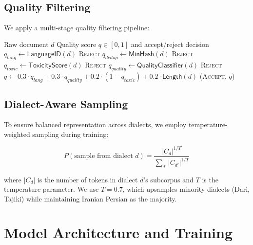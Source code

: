 \documentclass[11pt,a4paper]{article}
\begin{document}
\subsection{Quality Filtering}

We apply a multi-stage quality filtering pipeline:

\begin{algorithm}[H]
\caption{Corpus Quality Filtering}
\label{alg:filter}
\begin{algorithmic}[1]
\Require Raw document $d$
\Ensure Quality score $q \in [0, 1]$ and accept/reject decision
\State $q_{\mathit{lang}} \leftarrow \mathsf{LanguageID}(d)$ 
    \State \Return \textsc{Reject}
\EndIf
\State $q_{\mathit{dedup}} \leftarrow \mathsf{MinHash}(d)$ 
    \State \Return \textsc{Reject}
\EndIf
\State $q_{\mathit{toxic}} \leftarrow \mathsf{ToxicityScore}(d)$ 
    \State \Return \textsc{Reject}
\EndIf
\State $q_{\mathit{quality}} \leftarrow \mathsf{QualityClassifier}(d)$ 
    \State \Return \textsc{Reject}
\EndIf
\State $q \leftarrow 0.3 \cdot q_{\mathit{lang}} + 0.3 \cdot q_{\mathit{quality}} + 0.2 \cdot (1 - q_{\mathit{toxic}}) + 0.2 \cdot \mathsf{Length}(d)$
\State \Return (\textsc{Accept}, $q$)
\end{algorithmic}
\end{algorithm}

\subsection{Dialect-Aware Sampling}

To ensure balanced representation across dialects, we employ temperature-weighted sampling during training:

\begin{equation}
    P(\text{sample from dialect } d) = \frac{|C_d|^{1/T}}{\sum_{d'} |C_{d'}|^{1/T}}
\end{equation}

where $|C_d|$ is the number of tokens in dialect $d$'s subcorpus and $T$ is the temperature parameter. We use $T = 0.7$, which upsamples minority dialects (Dari, Tajiki) while maintaining Iranian Persian as the majority.

\section{Model Architecture and Training}
\end{document}
